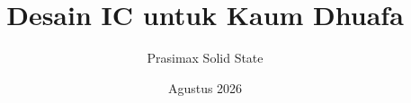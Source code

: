\documentclass[a4paper,12pt]{book}
\begin{document}
\author{Prasimax Solid State}
\title{Desain IC untuk Kaum Dhuafa}
\date{Agustus 2026}

\frontmatter
\maketitle
\tableofcontents

\mainmatter



\backmatter
\end{document}
